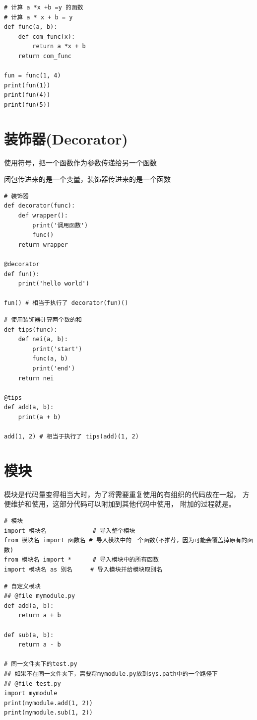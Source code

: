 \begin{lstlisting}[style=demostyle,numbers=none]
# 计算 a *x +b =y 的函数
# 计算 a * x + b = y
def func(a, b):
    def com_func(x):
        return a *x + b
    return com_func

fun = func(1, 4)   
print(fun(1))
print(fun(4))
print(fun(5))
\end{lstlisting}

\section{装饰器(Decorator)}
使用符号，把一个函数作为参数传递给另一个函数

闭包传进来的是一个变量，装饰器传进来的是一个函数
\begin{lstlisting}[style=demostyle,numbers=none]
# 装饰器
def decorator(func):
    def wrapper():
        print('调用函数')
        func()
    return wrapper

@decorator
def fun():
    print('hello world')

fun() # 相当于执行了 decorator(fun)()
\end{lstlisting}

\begin{lstlisting}[style=demostyle,numbers=none]
# 使用装饰器计算两个数的和
def tips(func):
    def nei(a, b):
        print('start')
        func(a, b)
        print('end')
    return nei

@tips  
def add(a, b):
    print(a + b)

add(1, 2) # 相当于执行了 tips(add)(1, 2)
\end{lstlisting}

\section{模块}
模块是代码量变得相当大时，为了将需要重复使用的有组织的代码放在一起，
方便维护和使用，这部分代码可以附加到其他代码中使用，
附加的过程就是。

\begin{lstlisting}[style=demostyle,numbers=none]
# 模块
import 模块名             # 导入整个模块
from 模块名 import 函数名 # 导入模块中的一个函数(不推荐，因为可能会覆盖掉原有的函数)
from 模块名 import *      # 导入模块中的所有函数
import 模块名 as 别名     # 导入模块并给模块取别名
\end{lstlisting}

\begin{lstlisting}[style=demostyle,numbers=none]
# 自定义模块
## @file mymodule.py
def add(a, b):
    return a + b

def sub(a, b):
    return a - b

# 同一文件夹下的test.py
## 如果不在同一文件夹下，需要将mymodule.py放到sys.path中的一个路径下
## @file test.py
import mymodule
print(mymodule.add(1, 2))
print(mymodule.sub(1, 2))
\end{lstlisting}




